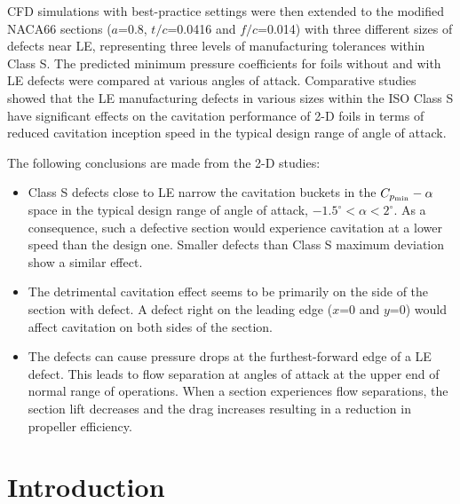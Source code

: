 \documentclass[onecolumn,11pt]{report}
\begin{document}
CFD simulations with best-practice settings were then extended to the modified NACA66 sections ($a$=0.8, $t/c$=0.0416 and $f/c$=0.014) with three different sizes of defects near LE, representing three levels of manufacturing tolerances within Class S. The predicted minimum pressure coefficients for foils without and with LE defects were compared at various angles of attack. Comparative studies showed that the LE manufacturing defects in various sizes within the ISO Class S have significant effects on the cavitation performance of 2-D foils in terms of reduced cavitation inception speed in the typical design range of angle of attack. 

The following conclusions are made from the 2-D studies:

\begin{itemize}

\item Class S defects close to LE narrow the cavitation buckets in the $C_{p_{\rm min}}-\alpha$ space in the typical design range of angle of attack, $-1.5^\circ<\alpha<2^\circ$. As a consequence, such a defective section would experience cavitation at a lower speed than the design one. Smaller defects than Class S maximum deviation show a similar effect.

\item The detrimental cavitation effect seems to be primarily on the side of the section with defect. A defect right on the leading edge ($x$=0 and $y$=0) would affect cavitation on both sides of the section. 

\item The defects can cause pressure drops at the furthest-forward edge of a LE defect. This leads to flow separation at angles of attack at the upper end of normal range of operations. When a section experiences flow separations, the section lift decreases and the drag increases resulting in a reduction in propeller efficiency.

\end{itemize}



\newpage

\chapter{Introduction}
\end{document}
